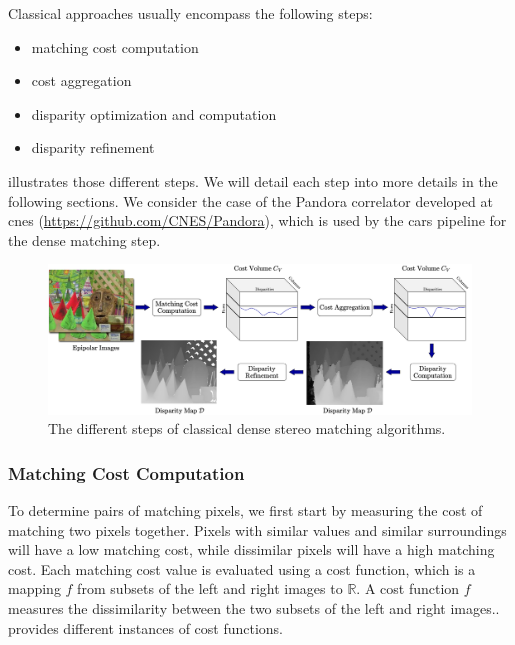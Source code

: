 Classical approaches usually encompass the following steps\cite{scharstein_taxonomy_2001}:
\begin{itemize}
    \item matching cost computation
    \item cost aggregation
    \item disparity optimization and computation
    \item disparity refinement
\end{itemize}
 illustrates those different steps. We will detail each step into more details in the following sections. We consider the case of the Pandora correlator developed at \acrshort{cnes} (\url{https://github.com/CNES/Pandora}), which is used by the \acrshort{cars} pipeline for the dense matching step.

\begin{figure}
	\centering
	\includegraphics[width=\linewidth]{Images/Chap_1/stereo-matching_pipeline.png}
	\caption{The different steps of classical dense stereo matching algorithms.}
	\label{fig:stereo_matching_pipeline}
\end{figure}

\subsubsection{Matching Cost Computation}\label{sec:cost_volume_computation}
To determine pairs of matching pixels, we first start by measuring the cost of matching two pixels together. Pixels with similar values and similar surroundings will have a low matching cost, while dissimilar pixels will have a high matching cost. Each matching cost value is evaluated using a cost function, which is a mapping $f$ from subsets of the left and right images to $\mathbb{R}$. A cost function $f$ measures the dissimilarity between the two subsets of the left and right images..  provides different instances of cost functions.


